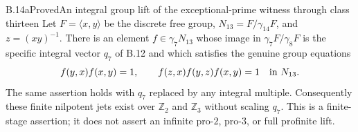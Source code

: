 \begin{statement}{B.14a}{Proved}{An integral group lift of the exceptional-prime witness through class thirteen}
Let $F=\langle x,y\rangle$ be the discrete free group,
$N_{13}=F/\gamma_{14}F$, and $z=(xy)^{-1}$.
There is an element $f\in\gamma_7N_{13}$ whose image in
$\gamma_7F/\gamma_8F$ is the specific integral vector
$q_7$ of B.12 and which satisfies the genuine group equations
\[
 f(y,x)f(x,y)=1,\qquad
 f(z,x)f(y,z)f(x,y)=1
 \quad\hbox{in }N_{13}.
\]
The same assertion holds with $q_7$ replaced by any integral
multiple. Consequently these finite nilpotent jets exist over
$\mathbb Z_2$ and $\mathbb Z_3$ without scaling $q_7$.
This is a finite-stage assertion; it does not assert an infinite
pro-$2$, pro-$3$, or full profinite lift.
\end{statement}
